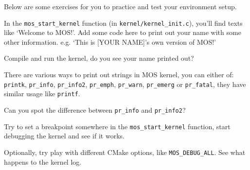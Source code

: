 Below are some exercises for you to practice and test your environment setup.

\begin{exercise}
    \item In the \texttt{mos\_start\_kernel} function (in \texttt{kernel/kernel\_init.c}), you'll find
    texts like `Welcome to MOS!'. Add some code here to print out your name with some other information.
    e.g. `This is [YOUR NAME]'s own version of MOS!'

    Compile and run the kernel, do you see your name printed out?

    \begin{tip}
        \item There are various ways to print out strings in MOS kernel, you can either of:
        \texttt{printk}, \texttt{pr\_info}, \texttt{pr\_info2}, \texttt{pr\_emph}, \texttt{pr\_warn},
        \texttt{pr\_emerg} or \texttt{pr\_fatal}, they have similar usage like \texttt{printf}.
        \item Can you spot the difference between \texttt{pr\_info} and \texttt{pr\_info2}?
    \end{tip}

    \item Try to set a breakpoint somewhere in the \texttt{mos\_start\_kernel} function, start debugging
    the kernel and see if it works.

    \item Optionally, try play with different CMake options, like \texttt{MOS\_DEBUG\_ALL}. See what happens to the
    kernel log.
\end{exercise}

